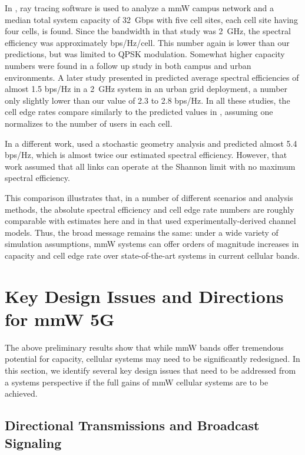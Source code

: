 \documentclass[journal]{IEEEtran}
\begin{document}
In \cite{PietBRPC:12},
ray tracing software is used to analyze
a mmW campus network and  a median total system capacity
of 32~Gbps with five cell sites, each cell site having four cells, is found.
Since the bandwidth in that study was 2~GHz, the spectral efficiency was
approximately  bps/Hz/cell.  This number again is lower than our predictions,
but \cite{PietBRPC:12} was limited to QPSK modulation.
Somewhat higher capacity numbers were found in a follow up
study \cite{abouelseoud2013system} in both campus and urban environments.
A later study presented in \cite{Ghosh-mmw:2013} predicted average
spectral efficiencies of almost 1.5 bps/Hz in a 2~GHz system
in an urban grid deployment, a number only slightly lower than our
value of 2.3 to 2.8 bps/Hz.
In all these studies, the cell edge rates
compare similarly to the predicted values in
\cite{AkLiuRanRapEr:13-arxiv}, assuming one normalizes to the
number of users in each cell.

In a different work, \cite{AkoumAyaHeath:12} used a stochastic geometry analysis
and predicted almost 5.4 bps/Hz, which is almost twice our estimated spectral
efficiency.  However, that work assumed that
all links can operate at the Shannon limit
with no maximum spectral efficiency.

This comparison illustrates that, in a number of different scenarios
and analysis methods, the absolute spectral efficiency and
cell edge rate numbers are roughly comparable with estimates here and
in  \cite{AkLiuRanRapEr:13-arxiv} that used experimentally-derived
channel models.
Thus, the broad message remains the same:  under a wide variety of simulation
assumptions, mmW systems can offer orders of magnitude increases in capacity
and cell edge rate over state-of-the-art systems in current cellular bands.


\section{Key Design Issues and Directions for mmW 5G} \label{sec:directions}

The above preliminary results show that while
mmW bands offer tremendous potential for capacity, cellular systems may need
to be significantly redesigned.
In this section, we identify several key design issues that need to be addressed
from a systems perspective if the full gains of mmW cellular systems are to be achieved.

\subsection{Directional Transmissions and Broadcast Signaling}
\end{document}
